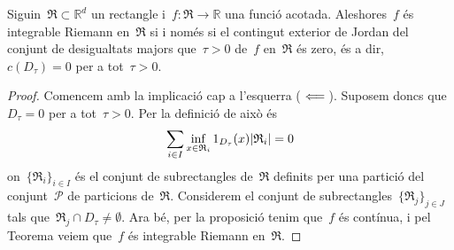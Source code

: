 \documentclass[../../main.tex]{subfiles}
\begin{document}
    \begin{theorem}
        Siguin~\(\mathfrak{R}\subset\mathbb{R}^{d}\) un rectangle i~\(f\colon\mathfrak{R}\to\mathbb{R}\) una funció acotada.
        Aleshores~\(f\) és integrable Riemann en~\(\mathfrak{R}\) si i només si el contingut exterior de Jordan del conjunt de desigualtats majors que~\(\tau>0\) de~\(f\) en~\(\mathfrak{R}\) és zero, és a dir,~\(c(D_{\tau})=0\) per a tot~\(\tau>0\).
        \begin{proof}
            Comencem amb la implicació cap a l'esquerra (\(\impliedby\)).
            Suposem doncs que~\(D_{\tau}=0\) per a tot~\(\tau>0\).
            Per la definició de  això és
            \[
                \sum_{i\in I}\inf_{x\in \mathfrak{R}_{i}}1_{D_{\tau}}(x)\abs{\mathfrak{R}_{i}}=0
            \]
            on~\(\{\mathfrak{R}_{i}\}_{i\in I}\) és el conjunt de subrectangles de~\(\mathfrak{R}\) definits per una partició del conjunt~\(\mathcal{P}\) de particions de~\(\mathfrak{R}\).
            Considerem el conjunt de subrectangles~\(\{\mathfrak{R}_{j}\}_{j\in J}\) tals que~\(\mathfrak{R}_{j}\cap D_{\tau}\neq\emptyset\).
            Ara bé, per la proposició  tenim que~\(f\) és contínua, i pel Teorema  veiem que~\(f\) és integrable Riemann en~\(\mathfrak{R}\).


\end{proof}
\end{theorem}
\end{document}
